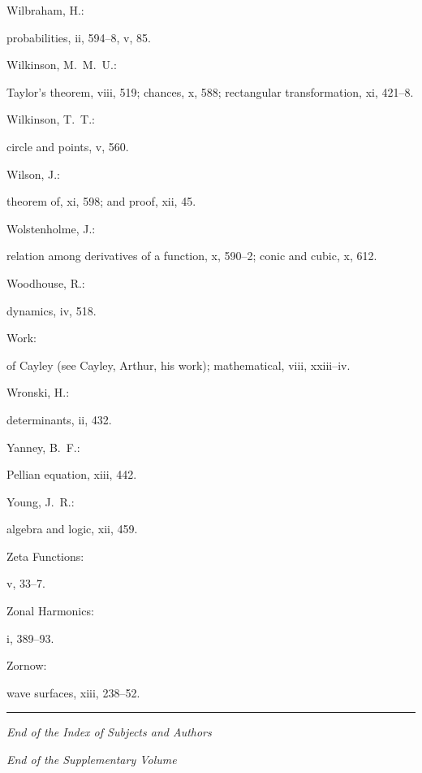 \documentclass[11pt,a4paper]{book}
\providecommand{\V}[1]{#1}
\providecommand{\IndexEntry}[2]{#1\dotfill #2\par}
\begin{document}
\newpage

\setcounter{page}{132}

\IndexEntry{Wilbraham, H.}: probabilities, \V{ii}, 594--8, \V{v}, 85.

\IndexEntry{Wilkinson, M.\ M.\ U.}: Taylor's theorem, \V{viii}, 519; chances, \V{x}, 588; rectangular transformation, \V{xi}, 421--8.

\IndexEntry{Wilkinson, T.\ T.}: circle and points, \V{v}, 560.

\IndexEntry{Wilson, J.}: theorem of, \V{xi}, 598; and proof, \V{xii}, 45.

\IndexEntry{Wolstenholme, J.}: relation among derivatives of a function, \V{x}, 590--2; conic and cubic, \V{x}, 612.

\IndexEntry{Woodhouse, R.}: dynamics, \V{iv}, 518.

\IndexEntry{Work}: of Cayley (see Cayley, Arthur, his work); mathematical, \V{viii}, xxiii--iv.

\IndexEntry{Wronski, H.}: determinants, \V{ii}, 432.

\IndexEntry{Yanney, B.\ F.}: Pellian equation, \V{xiii}, 442.

\IndexEntry{Young, J.\ R.}: algebra and logic, \V{xii}, 459.

\IndexEntry{Zeta Functions}: \V{v}, 33--7.

\IndexEntry{Zonal Harmonics}: \V{i}, 389--93.

\IndexEntry{Zornow}: wave surfaces, \V{xiii}, 238--52.

\vfill


\onecolumn
\normalsize

\begin{center}
\rule{0.5\textwidth}{0.4pt}

\vspace{1em}
\textit{End of the Index of Subjects and Authors}

\vspace{0.5em}
\textit{End of the Supplementary Volume}
\end{center}

\vfill

\clearpage
\thispagestyle{empty}
\null\newpage  %
\thispagestyle{empty}
\null\newpage  %
\thispagestyle{empty}
\null\newpage  %
\thispagestyle{empty}
\null\newpage  %
\thispagestyle{empty}
\null\newpage  %
\end{document}
